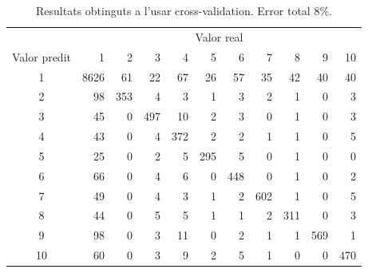\documentclass[a4paper]{article}
\begin{document}
\begin{table}[H]
	\centering
	\def\arraystretch{1.2}
	\begin{tabular}{|c|rrrrrrrrrr|}
		\hline
		& \multicolumn{10}{c|}{Valor real} \\
		Valor predit & 1 & 2 & 3 & 4 & 5 & 6 & 7 & 8 & 9 & 10 \\
		 \hline
		1 & 8626 & 61 & 22 & 67 & 26 & 57 & 35 & 42 & 40 & 40 \\
		2 & 98 & 353 & 4 & 3 & 1 & 3 & 2 & 1 & 0 & 3 \\
		3 & 45 & 0 & 497 & 10 & 2 & 3 & 0 & 1 & 0 & 3 \\
		4 & 43 & 0 & 4 & 372 & 2 & 2 & 1 & 1 & 0 & 5 \\
		5 & 25 & 0 & 2 & 5 & 295 & 5 & 0 & 1 & 0 & 0 \\
		6 & 66 & 0 & 4 & 6 & 0 & 448 & 0 & 1 & 0 & 2 \\
		7 & 49 & 0 & 4 & 3 & 1 & 2 & 602 & 1 & 0 & 5 \\
		8 & 44 & 0 & 5 & 5 & 1 & 1 & 2 & 311 & 0 & 3 \\
		9 & 98 & 0 & 3 & 11 & 0 & 2 & 1 & 1 & 569 & 1 \\
		10 & 60 & 0 & 3 & 9 & 2 & 5 & 1 & 0 & 0 & 470 \\
		\hline
	\end{tabular}
	\caption{Resultats obtinguts a l'usar cross-validation. Error total 8\%.}
\end{table}


\begin{figure}[H]
	\centering
\end{figure}
\end{document}
